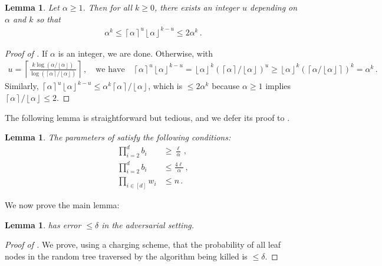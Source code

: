\documentclass[10pt,a4paper]{article}
\newtheorem{lemma}[theorem]{Lemma}
\theoremstyle{definition}
\theoremstyle{remark}
\newcommand{\ceil}[1]{{\left\lceil{#1}\right\rceil}}
\newcommand{\floor}[1]{{\left\lfloor{#1}\right\rfloor}}
\newcommand{\rl}{\mathbf{\ell}}             %
\begin{document}
\begin{itemize}
\begin{itemize}
\begin{lemma}\label{lem:fract-power-round}
  Let $\alpha \ge 1$. Then for all $k \ge 0$, there exists an integer $u$ depending
  on $\alpha$ and $k$ so that 
  \begin{align*}
    \alpha^k \le \ceil{\alpha}^u \floor{\alpha}^{k - u} \le 2 \alpha^k \,.
  \end{align*}
\end{lemma}

\begin{proof}[Proof of ]
  If $\alpha$ is an integer, we are done. Otherwise, with
  \begin{align*}
    u = \ceil{\frac{k \log(\alpha/\floor{\alpha})}{\log(\ceil{\alpha} /\floor{\alpha})}} \,, \quad \text{we have} \quad \ceil{\alpha}^u \floor{\alpha}^{k - u} = \floor{\alpha}^{k} (\ceil{\alpha}/\floor{\alpha})^u \ge \floor{\alpha}^{k} (\ceil{\alpha/\floor{\alpha}})^k = \alpha^k \,.
  \end{align*}
  Similarly, $\ceil{\alpha}^u \floor{\alpha}^{k - u} \le \alpha^k \ceil{\alpha}/\floor{\alpha}$, which is $\le 2\alpha^k$ because $\alpha \ge 1$ implies $\ceil{\alpha}/\floor{\alpha} \le 2$.
\end{proof}

The following lemma is straightforward but tedious, and we defer its proof to  .

\begin{lemma}\label{lem:rt-alg-params}
  The parameters of  satisfy the following conditions:
  \begin{align}
      \prod_{i=2}^{d} b_i &\ge \frac{\rl}{\alpha} \,, \label{eq:rt-ub-param-ge-l} \\
      \prod_{i=2}^{d} b_i &\le \frac{4 \rl}{\alpha} \,, \label{eq:rt-ub-param-le-2l}\\
      \prod_{i \in [d]} w_i &\le n \,. \label{eq:rt-ub-param-le-n}
  \end{align}
\end{lemma}

We now prove the main lemma:

\begin{lemma}\label{lem:rt-ub-error-limit}
   has error $\le \delta$ in the adversarial setting.
\end{lemma}

\begin{proof}[Proof of ]
  We prove, using a charging scheme, that the probability of all leaf nodes
  in the random tree traversed by the algorithm being killed is $\le \delta$.


\end{proof}
\end{itemize}
\end{itemize}
\end{document}
